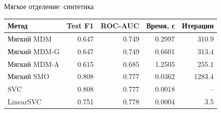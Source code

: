 \SPBGContentSlide
  {Мягкое отделение: синтетика}
  {%
    \centering
    \Body
    \renewcommand{\arraystretch}{1.16}
    \setlength{\tabcolsep}{8pt}
    \begin{tabular}{|l|r|r|r|r|}
      \hline
      Метод & Test F1 & ROC-AUC & Время, с & Итерации \\
      \hline
      Мягкий MDM & 0.647 & 0.749 & 0.2997 & 310.9 \\
      \hline
      Мягкий MDM-G & 0.647 & 0.749 & 0.6601 & 313.4 \\
      \hline
      Мягкий MDM-A & 0.615 & 0.685 & 1.2505 & 255.1 \\
      \hline
      Мягкий SMO & 0.808 & 0.777 & 0.0362 & 1283.4 \\
      \hline
      SVC & 0.808 & 0.777 & 0.0018 & -- \\
      \hline
      LinearSVC & 0.751 & 0.778 & 0.0004 & 3.5 \\
      \hline
    \end{tabular}
  }
